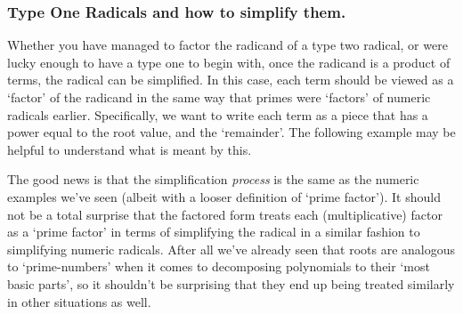     \subsubsection{Type One Radicals and how to simplify them.}

        Whether you have managed to factor the radicand of a type two radical, or were lucky enough to have a type one to begin with, once the radicand is a product of terms, the radical can be simplified. In this case, each term should be viewed as a `factor' of the radicand in the same way that primes were `factors' of numeric radicals earlier. Specifically, we want to write each term as a piece that has a power equal to the root value, and the `remainder'. The following example may be helpful to understand what is meant by this.


        The good news is that the simplification \textit{process} is the same as the numeric examples we've seen (albeit with a looser definition of `prime factor'). It should not be a total surprise that the factored form treats each (multiplicative) factor as a `prime factor' in terms of simplifying the radical in a similar fashion to simplifying numeric radicals. After all we've already seen that roots are analogous to `prime-numbers' when it comes to decomposing polynomials to their `most basic parts', so it shouldn't be surprising that they end up being treated similarly in other situations as well.

